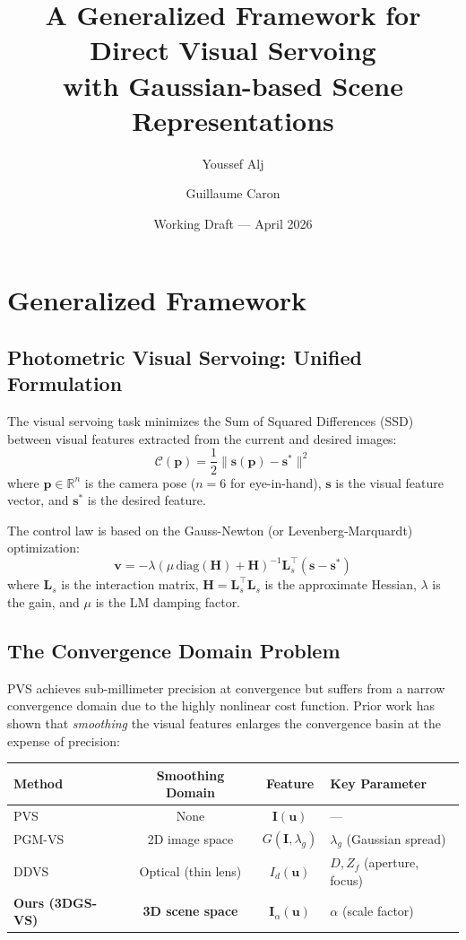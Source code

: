 \documentclass[11pt]{article}
\title{A Generalized Framework for Direct Visual Servoing\\with Gaussian-based Scene Representations}
\author{Youssef Alj \and Guillaume Caron}
\date{Working Draft --- April 2026}
\begin{document}
\maketitle

\section{Generalized Framework}

\subsection{Photometric Visual Servoing: Unified Formulation}

The visual servoing task minimizes the Sum of Squared Differences (SSD) between visual features extracted from the current and desired images:
\begin{equation}
    \mathcal{C}(\mathbf{p}) = \frac{1}{2} \| \mathbf{s}(\mathbf{p}) - \mathbf{s}^* \|^2
\end{equation}
where $\mathbf{p} \in \mathbb{R}^n$ is the camera pose ($n=6$ for eye-in-hand), $\mathbf{s}$ is the visual feature vector, and $\mathbf{s}^*$ is the desired feature.

The control law is based on the Gauss-Newton (or Levenberg-Marquardt) optimization:
\begin{equation}
    \mathbf{v} = -\lambda \left( \mu \, \text{diag}(\mathbf{H}) + \mathbf{H} \right)^{-1} \mathbf{L}_s^\top (\mathbf{s} - \mathbf{s}^*)
\end{equation}
where $\mathbf{L}_s$ is the interaction matrix, $\mathbf{H} = \mathbf{L}_s^\top \mathbf{L}_s$ is the approximate Hessian, $\lambda$ is the gain, and $\mu$ is the LM damping factor.

\subsection{The Convergence Domain Problem}

PVS achieves sub-millimeter precision at convergence but suffers from a narrow convergence domain due to the highly nonlinear cost function. Prior work has shown that \emph{smoothing} the visual features enlarges the convergence basin at the expense of precision:

\begin{center}
\renewcommand{\arraystretch}{1.3}
\begin{tabular}{lccl}
\toprule
\textbf{Method} & \textbf{Smoothing Domain} & \textbf{Feature} & \textbf{Key Parameter} \\
\midrule
PVS~\cite{collewet2011} & None & $\mathbf{I}(\mathbf{u})$ & --- \\
PGM-VS~\cite{crombez2019tro} & 2D image space & $G(\mathbf{I}, \lambda_g)$ & $\lambda_g$ (Gaussian spread) \\
DDVS~\cite{caron2021ral} & Optical (thin lens) & $I_d(\mathbf{u})$ & $D, Z_f$ (aperture, focus) \\
\textbf{Ours (3DGS-VS)} & \textbf{3D scene space} & $\mathbf{I}_\alpha(\mathbf{u})$ & $\alpha$ (scale factor) \\
\bottomrule
\end{tabular}
\end{center}
\end{document}
